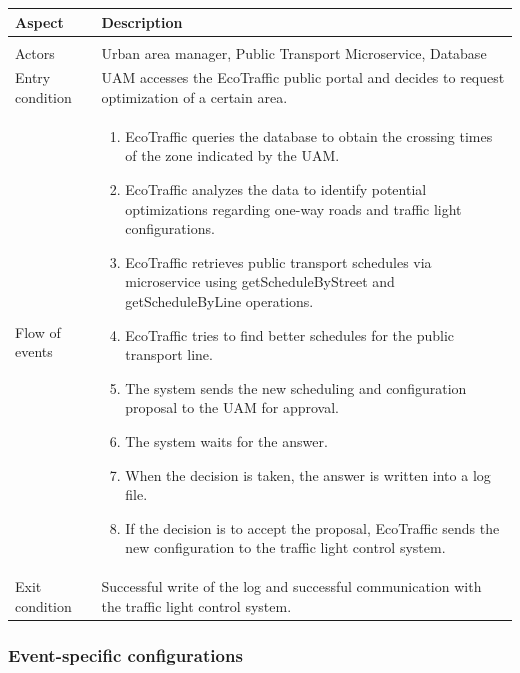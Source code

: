 \documentclass[12pt, a4paper, twoside, openright]{report}
\begin{document}
\begin{longtable}{>{\raggedright\arraybackslash}p{} >{\raggedright\arraybackslash}p{}}
\toprule
\textbf{Aspect} & \textbf{Description} \\
\midrule
\endhead
\midrule
\multicolumn{2}{r}{\textit{Continues on next page}} \\
\endfoot
\bottomrule
\endlastfoot

Actors & Urban area manager, Public Transport Microservice, Database \\
Entry condition & UAM accesses the EcoTraffic public portal and decides to request optimization of a certain area. \\
Flow of events &
\begin{enumerate}
  \item EcoTraffic queries the database to obtain the crossing times of the zone indicated by the UAM.
  \item EcoTraffic analyzes the data to identify potential optimizations regarding one-way roads and traffic light configurations.
  \item EcoTraffic retrieves public transport schedules via microservice using getScheduleByStreet and getScheduleByLine operations.
  \item EcoTraffic tries to find better schedules for the public transport line.
  \item The system sends the new scheduling and configuration proposal to the UAM for approval.
  \item The system waits for the answer.
  \item When the decision is taken, the answer is written into a log file.
  \item If the decision is to accept the proposal, EcoTraffic sends the new configuration to the traffic light control system.
\end{enumerate}
\\
Exit condition & Successful write of the log and successful communication with the traffic light control system. \\
\end{longtable}

\subsubsection{Event-specific configurations}
\end{document}
